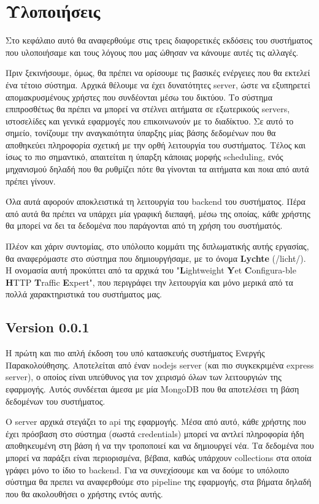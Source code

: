 \chapter{Υλοποιήσεις}
\label{chapter:implementations}

Στο κεφάλαιο αυτό θα αναφερθούμε στις τρεις διαφορετικές εκδόσεις του συστήματος που
υλοποιήσαμε και τους λόγους που μας ώθησαν να κάνουμε αυτές τις αλλαγές.

Πριν ξεκινήσουμε, όμως, θα πρέπει να ορίσουμε τις βασικές ενέργειες που θα εκτελεί ένα τέτοιο σύστημα.
Αρχικά θέλουμε να έχει δυνατότητες server, ώστε να εξυπηρετεί απομακρυσμένους χρήστες που συνδέονται μέσω του δικτύου.
Το σύστημα επιπροσθέτως θα πρέπει να μπορεί να στέλνει αιτήματα σε εξωτερικούς servers, ιστοσελίδες και γενικά
εφαρμογές που επικοινωνούν με το διαδίκτυο. Σε αυτό το σημείο, τονίζουμε την αναγκαιότητα ύπαρξης μίας βάσης δεδομένων που θα αποθηκεύει
πληροφορία σχετική με την ορθή λειτουργία του συστήματος. Τέλος και ίσως το πιο σημαντικό, απαιτείται η ύπαρξη κάποιας
μορφής scheduling, ενός μηχανισμού δηλαδή που θα ρυθμίζει πότε θα γίνονται τα αιτήματα και ποια από αυτά πρέπει γίνουν.

Όλα αυτά αφορούν αποκλειστικά τη λειτουργία του backend του συστήματος. Πέρα από αυτά
θα πρέπει να υπάρχει μία γραφική διεπαφή, μέσω της οποίας, κάθε χρήστης θα μπορεί να δει τα δεδομένα που παράγονται
από τη χρήση του συστήματός.

Πλέον και χάριν συντομίας, στο υπόλοιπο κομμάτι της διπλωματικής αυτής εργασίας, θα αναφερόμαστε
στο σύστημα που δημιουργήσαμε, με το όνομα \textbf{Lychte} (/licht/). Η ονομασία αυτή προκύπτει από τα αρχικά του "\textbf{L}ightweight
\textbf{Y}et \textbf{C}onfigura\hyp{}ble \textbf{H}ΤTP \textbf{T}raffic \textbf{E}xpert", που περιγράφει την λειτουργία και μόνο
μερικά από τα πολλά χαρακτηριστικά του συστήματος μας.

\section{Version 0.0.1}
\label{section:first_implementation}

Η πρώτη και πιο απλή έκδοση του υπό κατασκευής συστήματος Ενεργής Παρακολούθησης. Αποτελείται από έναν
nodejs server (και πιο συγκεκριμένα express server), ο οποίος είναι υπεύθυνος για τον χειρισμό όλων των λειτουργιών της εφαρμογής. Αυτός συνδέεται
άμεσα με μία MongoDB που θα αποτελέσει τη βάση δεδομένων του συστήματος.

Ο server αρχικά στεγάζει το api της εφαρμογής. Μέσα από αυτό, κάθε χρήστης που έχει πρόσβαση στο σύστημα (σωστά credentials)
μπορεί να αντλεί πληροφορία ήδη αποθηκευμένη στη βάση ή να την τροποποιεί και να δημιουργεί νέα. Τα δεδομένα που μπορεί να παράξει
είναι περιορισμένα, βέβαια, καθώς υπάρχουν collections στα οποία γράφει μόνο το ίδιο το backend. Για να συνεχίσουμε και να δούμε το υπόλοιπο σύστημα
θα πρεπει να αναφερθούμε στο pipeline της εφαρμογής, στα βήματα δηλαδή που θα ακολουθήσει ο χρήστης εντός αυτής.

